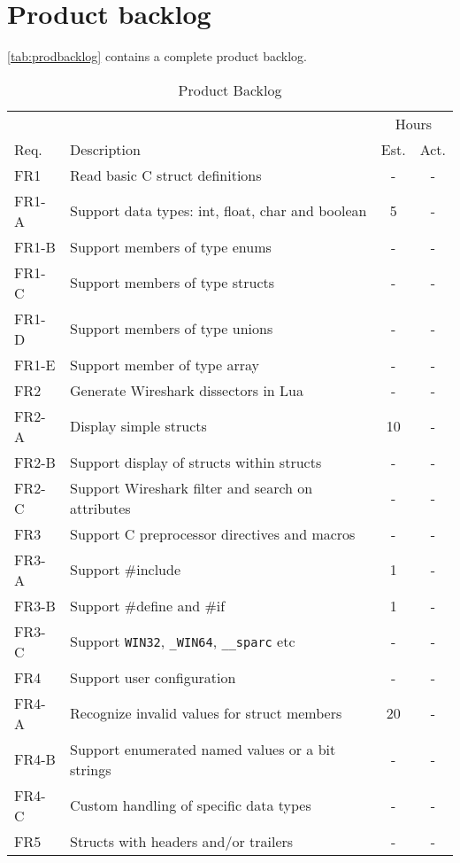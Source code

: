\section{Product backlog}
\label{sec:prodbacklog}
\autoref{tab:prodbacklog} contains a complete product backlog.

\begin{table}[ht] \small \center
\caption{Product Backlog \label{tab:prodbacklog}}
\begin{tabularx}{\textwidth}{l X c c}
	\toprule
	& & \multicolumn{2}{c}{Hours} \\
	\cmidrule(r){3-4}
	Req. & Description & Est. & Act. \\
	\midrule
	FR1 & Read basic C struct definitions & - & - \\
	FR1-A & Support data types: int, float, char and boolean & 5 & - \\
	FR1-B & Support members of type enums & - & - \\
	FR1-C & Support members of type structs & - & - \\
	FR1-D & Support members of type unions & - & - \\
	FR1-E & Support member of type array & - & - \\
	\addlinespace
	FR2 & Generate Wireshark dissectors in Lua & - & - \\
	FR2-A & Display simple structs & 10 & - \\
	FR2-B & Support display of structs within structs & - & - \\
	FR2-C & Support Wireshark filter and search on attributes & - & - \\
	\addlinespace
	FR3 & Support C preprocessor directives and macros & - & - \\
	FR3-A & Support \#include & 1 & - \\
	FR3-B & Support \#define and \#if & 1 & - \\
	FR3-C & Support \verb+WIN32+, \verb+_WIN64+, \verb+__sparc+ etc & - & - \\
	\addlinespace
	FR4 & Support user configuration & - & - \\
	FR4-A & Recognize invalid values for struct members & 20 & - \\
	FR4-B & Support enumerated named values or a bit strings & - & - \\
	FR4-C & Custom handling of specific data types & - & - \\
	\addlinespace
	FR5 & Structs with headers and/or trailers & - & - \\

\end{tabularx}
\end{table}
